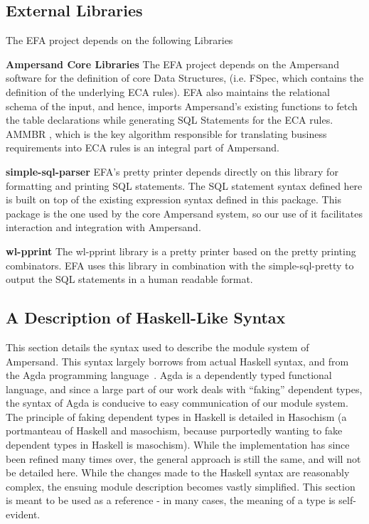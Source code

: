 \subsection{External Libraries}
The EFA project depends on the following Libraries 
\begin{description}
    \item \textbf{Ampersand Core Libraries} \newline
    The EFA project depends on the Ampersand software for the definition of 
    core Data Structures, (i.e. FSpec, which contains the definition of 
    the underlying ECA rules). EFA also maintains the relational schema of 
    the input, and hence, imports Ampersand's existing functions to fetch 
    the table declarations while generating SQL Statements for the ECA 
    rules. AMMBR \cite{AMMBR}, which is the key algorithm responsible for 
    translating business requirements into ECA rules is an integral part of 
    Ampersand.
    \item \textbf{simple-sql-parser} \newline
    EFA's pretty printer depends directly on this library for formatting 
    and printing SQL statements. The SQL statement syntax 
    defined here is built on top of the existing expression syntax defined 
    in this package. This package is the one used by the core Ampersand system,
    so our use of it facilitates interaction and integration with Ampersand. 
    \cite{simple-sql}
    \item \textbf{wl-pprint} \newline 
    The wl-pprint library\cite{wl-pprint} is a pretty printer based on the
    pretty printing combinators. EFA uses this library in combination with
    the simple-sql-pretty to output the SQL statements in a human readable
    format.
    \item 
\end{description}

\noindent
\subsection{A Description of Haskell-Like Syntax}\label{subsec:HaskellSyntax}

This section details the syntax used to describe the module system of
Ampersand. This syntax largely borrows from actual Haskell syntax, and from the
Agda programming language~\cite{agda}.
Agda is a dependently typed functional
language, and since a large part of our work deals with ``faking'' dependent
types, the syntax of Agda is conducive to easy communication of our module 
system. The
principle of faking dependent types in Haskell is detailed in
Hasochism \citep{hasochism} 
(a portmanteau of Haskell and masochism, because
purportedly wanting to fake dependent types in Haskell is masochism). While the
implementation has since been refined many times over, the general approach is 
still the
same, and will not be detailed here.
While the changes made to the Haskell syntax are reasonably complex, the 
ensuing 
module description becomes vastly simplified. This section is meant to be used
as a reference - in many cases, the meaning of a type is self-evident. 

